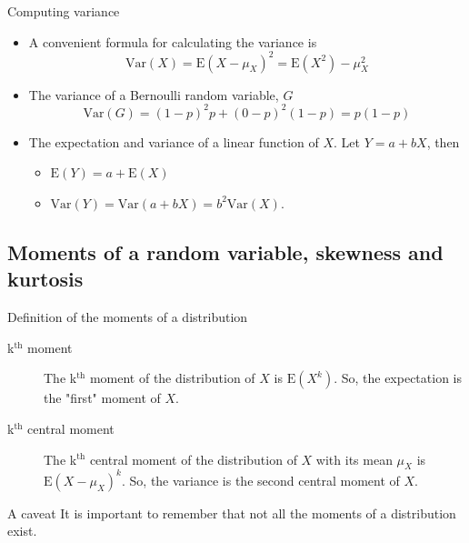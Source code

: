 \documentclass[presentation]{beamer}
\begin{document}
\begin{frame}[label={sec:orgbd52c9e}]{Computing variance}
\begin{itemize}
\item A convenient formula for calculating the variance is
\[ \mathrm{Var}(X) = \mathrm{E}(X - \mu_X)^{2} = \mathrm{E}(X^{2}) - \mu_X^{2} \]

\item The variance of a Bernoulli random variable, \(G\)
\[ \mathrm{Var}(G) = (1-p)^{2}p + (0-p)^{2}(1-p) = p(1-p) \]

\item The expectation and variance of a linear function of \(X\). Let \(Y = a +
  bX\), then
\begin{itemize}
\item \(\mathrm{E}(Y) = a + \mathrm{E}(X)\)
\item \(\mathrm{Var}(Y) = \mathrm{Var}(a + b X) = b^{2} \mathrm{Var}(X)\).
\end{itemize}
\end{itemize}
\end{frame}

\subsection*{Moments of a random variable, skewness and kurtosis}
\label{sec:orgdb62186}

\begin{frame}[label={sec:org9f88054}]{Definition of the moments of a distribution}
\begin{description}
\item[{k\(^{\text{th}}\) moment}] The k\(^{\text{th}}\) \alert{moment} of the distribution of \(X\) is
\(\mathrm{E}(X^{k})\). So, the expectation is the "first"
moment of \(X\).

\item[{k\(^{\text{th}}\) central moment}] The k\(^{\text{th}}\) central moment of the distribution
of \(X\) with its mean \(\mu_X\) is \(\mathrm{E}(X - \mu_X)^{k}\). So, the
variance is the second central moment of \(X\).
\end{description}

\begin{block}{A caveat}
It is important to remember that not all the moments of a distribution
exist. 
\end{block}
\end{frame}
\end{document}
